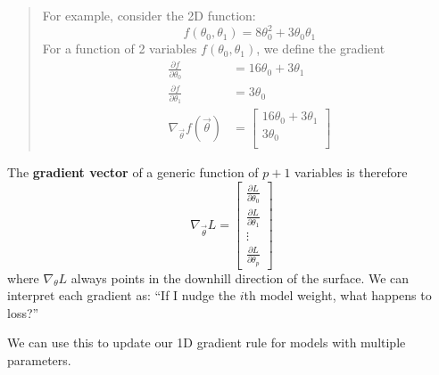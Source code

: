 \documentclass[
  letterpaper,
  DIV=11,
  numbers=noendperiod]{scrreprt}
\begin{document}
\begin{quote}
For example, consider the 2D function:
\[f(\theta_0, \theta_1) = 8 \theta_0^2 + 3\theta_0\theta_1\] For a
function of 2 variables \(f(\theta_0, \theta_1)\), we define the
gradient \[
\begin{align}
\frac{\partial f}{\partial \theta_{0}} &= 16\theta_0 + 3\theta_1 \\
\frac{\partial f}{\partial \theta_{1}} &= 3\theta_0 \\
\nabla_{\vec{\theta}} f(\vec{\theta}) &=  \begin{bmatrix} 16\theta_0 + 3\theta_1 \\ 3\theta_0 \\ \end{bmatrix}
\end{align}
\]
\end{quote}

The \textbf{gradient vector} of a generic function of \(p+1\) variables
is therefore
\[\nabla_{\vec{\theta}} L =  \begin{bmatrix} \frac{\partial L}{\partial \theta_0} \\ \frac{\partial L}{\partial \theta_1} \\ \vdots \\ \frac{\partial L}{\partial \theta_p} \end{bmatrix}\]
where \(\nabla_\theta L\) always points in the downhill direction of the
surface. We can interpret each gradient as: ``If I nudge the \(i\)th
model weight, what happens to loss?''

We can use this to update our 1D gradient rule for models with multiple
parameters.
\end{document}
